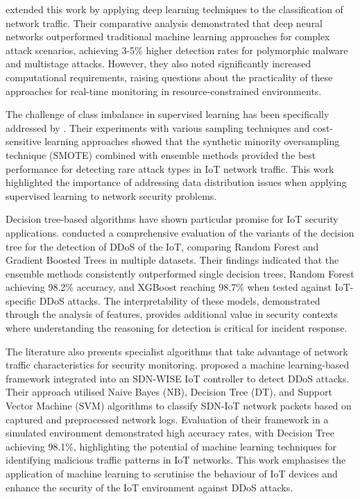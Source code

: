 \citet{Vinayakumar2019} extended this work by applying deep learning techniques to the classification of network traffic. Their comparative analysis demonstrated that deep neural networks outperformed traditional machine learning approaches for complex attack scenarios, achieving 3-5\% higher detection rates for polymorphic malware and multistage attacks. However, they also noted significantly increased computational requirements, raising questions about the practicality of these approaches for real-time monitoring in resource-constrained environments.

The challenge of class imbalance in supervised learning has been specifically addressed by \citep{Aldweesh2020}. Their experiments with various sampling techniques and cost-sensitive learning approaches showed that the synthetic minority oversampling technique (SMOTE) combined with ensemble methods provided the best performance for detecting rare attack types in IoT network traffic. This work highlighted the importance of addressing data distribution issues when applying supervised learning to network security problems.

Decision tree-based algorithms have shown particular promise for IoT security applications. \citet{Doshi2018} conducted a comprehensive evaluation of the variants of the decision tree for the detection of DDoS of the IoT, comparing Random Forest and Gradient Boosted Trees in multiple datasets. Their findings indicated that the ensemble methods consistently outperformed single decision trees, Random Forest achieving 98.2\% accuracy, and XGBoost reaching 98.7\% when tested against IoT-specific DDoS attacks. The interpretability of these models, demonstrated through the analysis of features, provides additional value in security contexts where understanding the reasoning for detection is critical for incident response.

The literature also presents specialist algorithms that take advantage of network traffic characteristics for security monitoring. \citet{bhayo2023towards} proposed a machine learning-based framework integrated into an SDN-WISE IoT controller to detect DDoS attacks. Their approach utilised Naive Bayes (NB), Decision Tree (DT), and Support Vector Machine (SVM) algorithms to classify SDN-IoT network packets based on captured and preprocessed network logs. Evaluation of their framework in a simulated environment demonstrated high accuracy rates, with Decision Tree achieving 98.1\%, highlighting the potential of machine learning techniques for identifying malicious traffic patterns in IoT networks. This work emphasises the application of machine learning to scrutinise the behaviour of IoT devices and enhance the security of the IoT environment against DDoS attacks.

